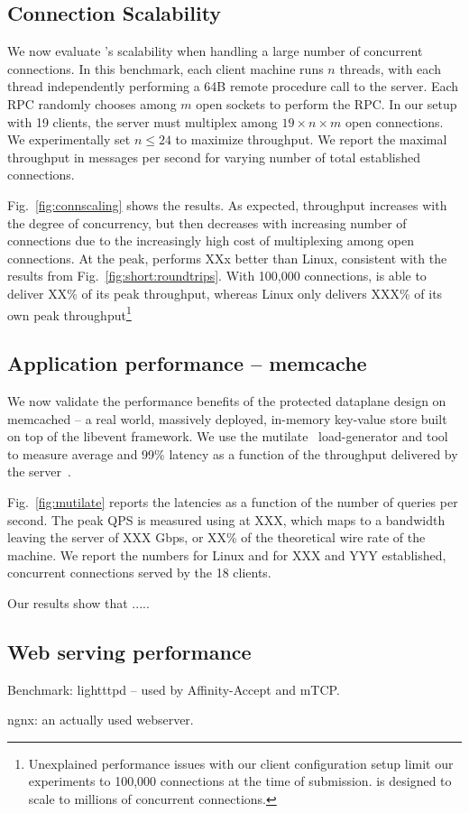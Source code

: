 \subsection{Connection Scalability}


\label{sec:eval:scale}

We now evaluate \ix's scalability when handling a large number of
concurrent connections. In this benchmark, each client machine runs
$n$ threads, with each thread independently performing a 64B remote
procedure call to the server.  Each RPC randomly chooses among $m$
open sockets to perform the RPC.  In our setup with 19 clients, the
server must multiplex among $19 \times n \times m$ open connections.
We experimentally set $n \leq 24$ to maximize throughput.  We report
the maximal throughput in messages per second for varying number of
total established connections.

Fig.~\ref{fig:connscaling} shows the results.  As expected, throughput
increases with the degree of concurrency, but then decreases with
increasing number of connections due to the increasingly high cost of
multiplexing among open connections.  At the peak, \ix performs XXx
better than Linux, consistent with the results from
Fig.~\ref{fig:short:roundtrips}.  With 100,000 connections, \ix is
able to deliver XX\% of its peak throughput, whereas Linux only
delivers XXX\% of its own peak throughput\footnote{Unexplained
  performance issues with our client configuration setup limit our
  experiments to 100,000 connections at the time of submission. \ix is
  designed to scale to millions of concurrent connections.}


\subsection{Application performance -- memcache}
\label{sec:eval:memcached}



We now validate the performance benefits of the protected dataplane
design on memcached -- a real world, massively deployed, in-memory
key-value store built on top of the libevent framework.  We use the
mutilate~\cite{url:mutilate} load-generator and tool to measure
average and 99\% latency as a function of the throughput delivered by
the server~\cite{Leverich:RHSU:2014}.

Fig.~\ref{fig:mutilate} reports the latencies as a function of the
number of queries per second.  The peak QPS is measured using \ix at
XXX, which maps to a bandwidth leaving the server of XXX Gbps, or XX\%
of the theoretical wire rate of the machine.  We report the numbers
for Linux and \ix for XXX and YYY established, concurrent
connections served by the 18 clients.

Our results show that .....

\subsection{Web serving performance}


\todo Benchmark: lightttpd -- used by Affinity-Accept and mTCP.  

\todo ngnx: an actually used webserver.



%
